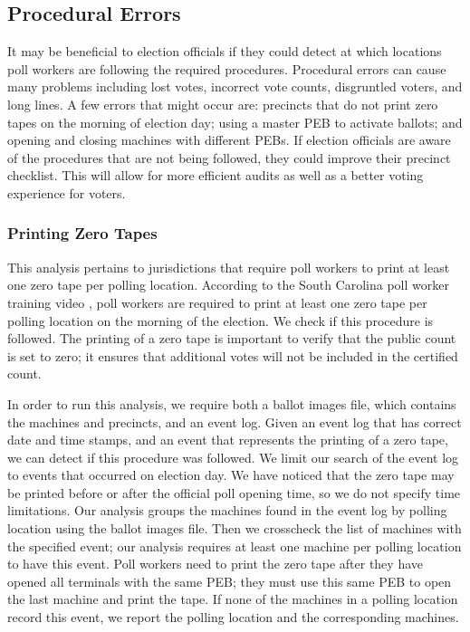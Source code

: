 \subsection{Procedural Errors}
It may be beneficial to election officials if they could detect at which locations poll workers are following the required procedures. Procedural errors can cause many problems including lost votes, incorrect vote counts, disgruntled voters, and long lines. A few errors that might occur are: precincts that do not print zero tapes on the morning of election day; using a master PEB to activate ballots; and opening and closing machines with different PEBs. If election officials are aware of the procedures that are not being followed, they could improve their precinct checklist. This will allow for more efficient audits as well as a better voting experience for voters.

\subsubsection{Printing Zero Tapes}
This analysis pertains to jurisdictions that require poll workers to print at least one zero tape per polling location.  According to the South Carolina poll worker training video \cite{??}, poll workers are required to print at least one zero tape per polling location on the morning of the election.  We check if this procedure is followed.  The printing of a zero tape is important to verify that the public count is set to zero; it ensures that additional votes will not be included in the certified count.  

In order to run this analysis, we require both a ballot images file, which contains the machines and precincts, and an event log.  Given an event log that has correct date and time stamps, and an event that represents the printing of a zero tape, we can detect if this procedure was followed.  We limit our search of the event log to events that occurred on election day.  We have noticed that the zero tape may be printed before or after the official poll opening time, so we do not specify time limitations.  Our analysis groups the machines found in the event log by polling location using the ballot images file.  Then we crosscheck the list of machines with the specified event; our analysis requires at least one machine per polling location to have this event.  Poll workers need to print the zero tape after they have opened all terminals with the same PEB; they must use this same PEB to open the last machine and print the tape.  If none of the machines in a polling location record this event, we report the polling location and the corresponding machines.

